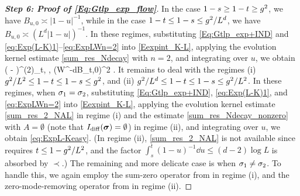 \begin{proof}[\bf Step 6: Proof of \eqref{Eq:Gtlp_exp_flow}]
In the case $1-s\ge 1-t\ge g^2$, we have $B_{u,0}\asymp |1-u|^{-1}$, while in the case $1-t\le 1-s\le g^2/L^d$, we have $B_{u,0}\asymp (L^d|1-u|)^{-1}$. In these regimes, substituting \eqref{Eq:Gtlp_exp+IND} and \eqref{eq:Exp(L-K)1}--\eqref{eq:ExpLWn=2} into \eqref{Eexpint_K-L}, applying the evolution kernel estimate \eqref{sum_res_Ndecay} with $n=2$, and integrating over $u$, we obtain  
\be\label{eq:ExpL-Keasy} \E( - )^{(2)}_{t, \bsig, \ba} \prec (W^{-d}B_{t,0})^{2}
.\ee
It remains to deal with the regimes (i) $g^2/L^{2}\le 1- t\le 1-s \le g^2$, and (ii) $g^2/L^{d}\le 1-t\le 1-s\le g^2/L^{2}$. In these regimes, when $\sigma_1=\sigma_2$, substituting \eqref{Eq:Gtlp_exp+IND}, \eqref{eq:Exp(L-K)1}, and \eqref{eq:ExpLWn=2} into \eqref{Eexpint_K-L}, applying the evolution kernel estimate \eqref{sum_res_2_NAL} in regime (i) and the estimate \eqref{sum_res_Ndecay_nonzero} with $A=\emptyset$ (note that $I_{\mathrm{diff}}({\boldsymbol{\sigma}})=\emptyset$) in regime (ii), and integrating over $u$, we obtain \eqref{eq:ExpL-Keasy}. (In regime (ii), \eqref{sum_res_2_NAL} is not available since  requires $t\le 1-g^2/L^2$, and the factor $\int_s^t(1-u)^{-1}\dd u\le (d-2)\log L$ is absorbed by $\prec$.) 
The remaining and more delicate case is when $\sigma_1\ne \sigma_2$. To handle this, we again employ the sum-zero operator from  in regime (i), and the zero-mode-removing operator from  in regime (ii).

\medskip


\end{proof}

